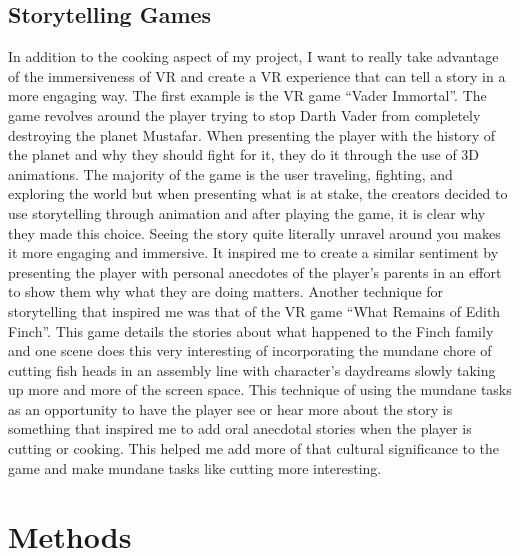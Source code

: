 \documentclass[10pt,twocolumn]{article}
\begin{document}
\subsection{Storytelling Games}
In addition to the cooking aspect of my project, I want to really take advantage of the immersiveness of VR and create a VR experience that can tell a story in a more engaging way. The first example is the VR game “Vader Immortal”. The game revolves around the player trying to stop Darth Vader from completely destroying the planet Mustafar. When presenting the player with the history of the planet and why they should fight for it, they do it through the use of 3D animations. The majority of the game is the user traveling, fighting, and exploring the world but when presenting what is at stake, the creators decided to use storytelling through animation and after playing the game, it is clear why they made this choice. Seeing the story quite literally unravel around you makes it more engaging and immersive. It inspired me to create a similar sentiment by presenting the player with personal anecdotes of the player’s parents in an effort to show them why what they are doing matters. Another technique for storytelling that inspired me was that of the VR game “What Remains of Edith Finch”. This game details the stories about what happened to the Finch family and one scene does this very interesting of incorporating the mundane chore of cutting fish heads in an assembly line with character’s daydreams slowly taking up more and more of the screen space. This technique of using the mundane tasks as an opportunity to have the player see or hear more about the story is something that inspired me to add oral anecdotal stories when the player is cutting or cooking. This helped me add more of that cultural significance to the game and make mundane tasks like cutting more interesting.

\section{Methods}
\end{document}
